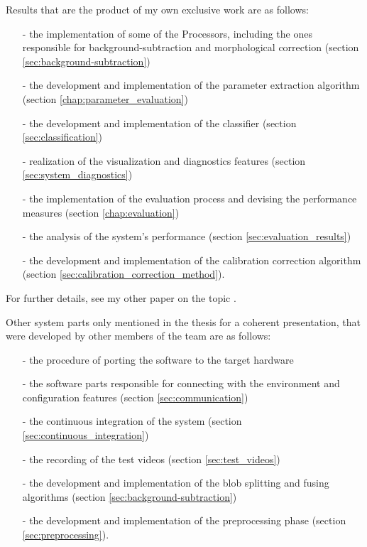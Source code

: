 \noindent Results that are the product of my own exclusive work are as follows:
\begin{itemize}
	\item[-] the implementation of some of the Processors, including the ones responsible for background-subtraction and morphological correction (section \ref{sec:background-subtraction})
	\item[-] the development and implementation of the parameter extraction algorithm (section \ref{chap:parameter_evaluation})
	\item[-] the development and implementation of the classifier (section \ref{sec:classification})
	\item[-] realization of the visualization and diagnostics features (section \ref{sec:system_diagnostics})
	\item[-] the implementation of the evaluation process and devising the performance measures (section \ref{chap:evaluation})
	\item[-] the analysis of the system's performance (section \ref{sec:evaluation_results})
	\item[-] the development and implementation of the calibration correction algorithm (section \ref{sec:calibration_correction_method}).
\end{itemize}
For further details, see my other paper on the topic \cite{Barancsuk2016}.

\noindent Other system parts only mentioned in the thesis for a coherent presentation, that were developed by other members of the team are as follows:
\begin{itemize}
	\item[-] the procedure of porting the software to the target hardware
	\item[-] the software parts responsible for connecting with the environment and configuration features (section \ref{sec:communication})
	\item[-] the continuous integration of the system (section \ref{sec:continuous_integration})
	\item[-] the recording of the test videos (section \ref{sec:test_videos})
	\item[-] the development and implementation of the blob splitting and fusing algorithms (section \ref{sec:background-subtraction})
	\item[-] the development and implementation of the preprocessing phase (section \ref{sec:preprocessing}).
\end{itemize}


